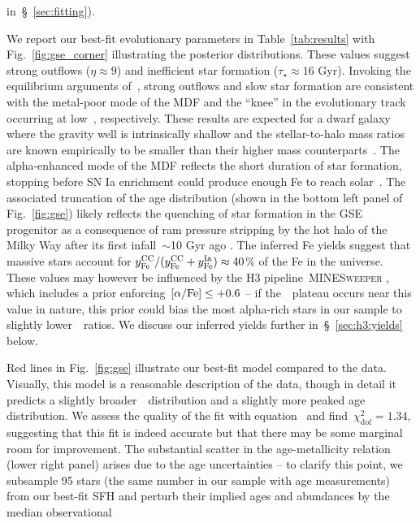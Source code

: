 \documentclass[foo.tex]{subfiles}
\begin{document}
in~\S~\ref{sec:fitting}).
\par
We report our best-fit evolutionary parameters in Table~\ref{tab:results}
with Fig.~\ref{fig:gse_corner} illustrating the posterior distributions.
These values suggest strong outflows ($\eta \approx 9$) and inefficient star
formation ($\tau_\star \approx 16$ Gyr).
Invoking the equilibrium arguments of~\citet{Weinberg2017}, strong outflows and
slow star formation are consistent with the metal-poor mode of the MDF and the
``knee'' in the evolutionary track occurring at low~\feh, respectively.
These results are expected for a dwarf galaxy where the gravity well is
intrinsically shallow and the stellar-to-halo mass ratios are known empirically
to be smaller than their higher mass counterparts~\citep{Hudson2015}.
The alpha-enhanced mode of the MDF reflects the short duration of star
formation, stopping before SN Ia enrichment could produce enough Fe to reach
solar~\afe.
The associated truncation of the age distribution (shown in the bottom left
panel of Fig.~\ref{fig:gse}) likely reflects the quenching of star
formation in the GSE progenitor as a consequence of ram pressure stripping by
the hot halo of the Milky Way after its first infall~$\sim$10 Gyr ago
\citep{Bonaca2020}.
The inferred Fe yields suggest that massive stars account for
$y_\text{Fe}^\text{CC} / (y_\text{Fe}^\text{CC} + y_\text{Fe}^\text{Ia}) \approx 40$\% of the Fe in the universe.
These values may however be influenced by the H3 pipeline~\textsc{MINESweeper}
\citep{Cargile2020}, which includes a prior enforcing~$\text{[$\alpha$/Fe]} \leq +0.6$ -- if
the~\afe~plateau occurs near this value in nature, this prior could bias the
most alpha-rich stars in our sample to slightly lower~\afe~ratios.
{\color{red}
We discuss our inferred yields further in~\S~\ref{sec:h3:yields} below.
}
\par
Red lines in Fig.~\ref{fig:gse} illustrate our best-fit model compared to the
data.
Visually, this model is a reasonable description of the data, though in detail
it predicts a slightly broader~\feh~distribution and a slightly more peaked age
distribution.
We assess the quality of the fit with equation~ and
find~$\chi_\text{dof}^2 = 1.34$, suggesting that this fit is indeed accurate
but that there may be some marginal room for improvement.
The substantial scatter in the age-metallicity relation (lower right panel)
arises due to the age uncertainties -- to clarify this point, we subsample 95
stars (the same number in our sample with age measurements) from our best-fit
SFH and perturb their implied ages and abundances by the median observational
\end{document}
